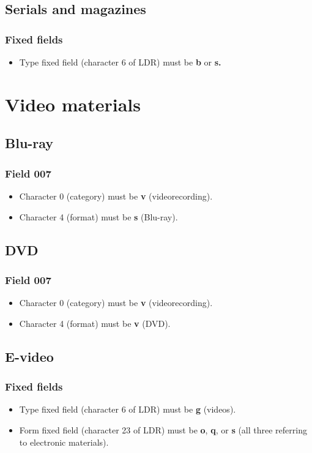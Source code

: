 \documentclass[a4paper,10pt]{amsart}
\let\stdsection\section
\renewcommand\section{\newpage\stdsection}
\begin{document}
\subsection{Serials and magazines}
\subsubsection*{Fixed fields}
\begin{itemize}
 \item Type fixed field (character 6 of LDR) must be {\bf b} or {\bf s.}
\end{itemize}



\section{Video materials}

\subsection{Blu-ray}
\subsubsection*{Field 007}
\begin{itemize}
 \item Character 0 (category) must be {\bf v} (videorecording).
 \item Character 4 (format) must be {\bf s} (Blu-ray).
\end{itemize}


\subsection{DVD}
\subsubsection*{Field 007}
\begin{itemize}
 \item Character 0 (category) must be {\bf v} (videorecording).
 \item Character 4 (format) must be {\bf v} (DVD).
\end{itemize}

\subsection{E-video}
\subsubsection*{Fixed fields}
\begin{itemize}
 \item Type fixed field (character 6 of LDR) must be {\bf g} (videos).
 \item Form fixed field (character 23 of LDR) must be {\bf o}, {\bf q}, or {\bf s} (all three referring to electronic materials).
\end{itemize}
\end{document}
